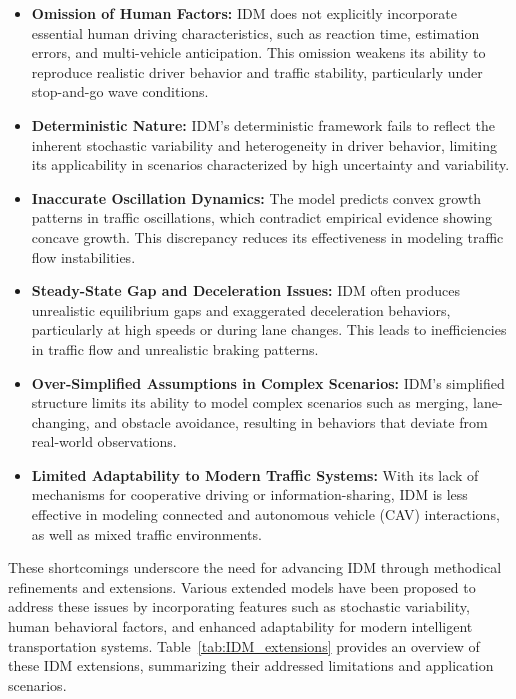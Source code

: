 \documentclass[a4paper,fleqn]{cas-sc}
\begin{document}
\begin{itemize}
    \item \textbf{Omission of Human Factors:} IDM does not explicitly incorporate essential human driving characteristics, such as reaction time, estimation errors, and multi-vehicle anticipation. This omission weakens its ability to reproduce realistic driver behavior and traffic stability, particularly under stop-and-go wave conditions.

    \item \textbf{Deterministic Nature:} IDM's deterministic framework fails to reflect the inherent stochastic variability and heterogeneity in driver behavior, limiting its applicability in scenarios characterized by high uncertainty and variability.

    \item \textbf{Inaccurate Oscillation Dynamics:} The model predicts convex growth patterns in traffic oscillations, which contradict empirical evidence showing concave growth. This discrepancy reduces its effectiveness in modeling traffic flow instabilities.

    \item \textbf{Steady-State Gap and Deceleration Issues:} IDM often produces unrealistic equilibrium gaps and exaggerated deceleration behaviors, particularly at high speeds or during lane changes. This leads to inefficiencies in traffic flow and unrealistic braking patterns.

    \item \textbf{Over-Simplified Assumptions in Complex Scenarios:} IDM's simplified structure limits its ability to model complex scenarios such as merging, lane-changing, and obstacle avoidance, resulting in behaviors that deviate from real-world observations.

    \item \textbf{Limited Adaptability to Modern Traffic Systems:} With its lack of mechanisms for cooperative driving or information-sharing, IDM is less effective in modeling connected and autonomous vehicle (CAV) interactions, as well as mixed traffic environments.
\end{itemize}

These shortcomings underscore the need for advancing IDM through methodical refinements and extensions. Various extended models have been proposed to address these issues by incorporating features such as stochastic variability, human behavioral factors, and enhanced adaptability for modern intelligent transportation systems. Table~\ref{tab:IDM_extensions} provides an overview of these IDM extensions, summarizing their addressed limitations and application scenarios.
\end{document}
